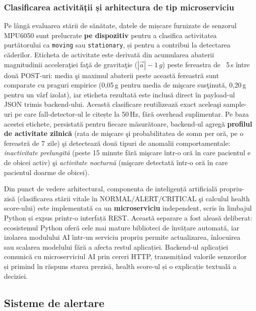 \documentclass[12pt,a4paper,twoside]{article}
\begin{document}
\subsubsection{Clasificarea activității și arhitectura de tip microserviciu}

Pe lângă evaluarea stării de sănătate, datele de mișcare furnizate de senzorul MPU6050 sunt prelucrate \textbf{pe dispozitiv} pentru a clasifica activitatea purtătorului ca \texttt{moving} sau \texttt{stationary}, și pentru a contribui la detectarea căderilor. Eticheta de activitate este derivată din acumularea abaterii magnitudinii acceleraţiei faţă de gravitaţie ($|\vec{a}| - 1\,g$) peste fereastra de ~5\,s între două POST-uri: media şi maximul abaterii peste această fereastră sunt comparate cu praguri empirice (0,05\,g pentru media de mişcare susţinută, 0,20\,g pentru un vârf izolat), iar eticheta rezultată este inclusă direct în payload-ul JSON trimis backend-ului. Această clasificare reutilizează exact aceleaşi sample-uri pe care fall-detector-ul le citește la 50\,Hz, fără overhead suplimentar. Pe baza acestei etichete, persistată pentru fiecare măsurătoare, backend-ul agregă \textbf{profilul de activitate zilnică} (rata de mişcare şi probabilitatea de somn per oră, pe o fereastră de 7 zile) şi detectează două tipuri de anomalii comportamentale: \textit{inactivitate prelungită} (peste 15 minute fără mişcare într-o oră în care pacientul e de obicei activ) şi \textit{activitate nocturnă} (mişcare detectată într-o oră în care pacientul doarme de obicei).

Din punct de vedere arhitectural, componenta de inteligență artificială propriu-zisă (clasificarea stării vitale în NORMAL/ALERT/CRITICAL şi calculul health score-ului) este implementată ca un \textbf{microserviciu} independent, scris în limbajul Python și expus printr-o interfață REST. Această separare a fost aleasă deliberat: ecosistemul Python oferă cele mai mature biblioteci de învățare automată, iar izolarea modulului AI într-un serviciu propriu permite actualizarea, înlocuirea sau scalarea modelului fără a afecta restul aplicației. Backend-ul aplicației comunică cu microserviciul AI prin cereri HTTP, transmițând valorile senzorilor și primind în răspuns starea prezisă, health score-ul și o explicație textuală a deciziei.

\subsection{Sisteme de alertare}
\end{document}
